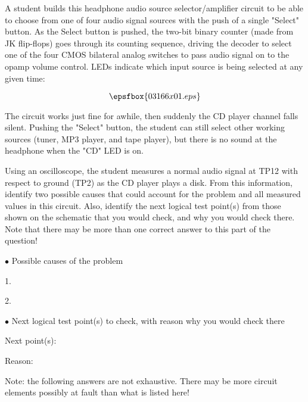 

A student builds this headphone audio source selector/amplifier circuit to be able to choose from one of four audio signal sources with the push of a single "Select" button.  As the Select button is pushed, the two-bit binary counter (made from JK flip-flops) goes through its counting sequence, driving the decoder to select one of the four CMOS bilateral analog switches to pass audio signal on to the opamp volume control.  LEDs indicate which input source is being selected at any given time:

$$\epsfbox{03166x01.eps}$$

The circuit works just fine for awhile, then suddenly the CD player channel falls silent.  Pushing the "Select" button, the student can still select other working sources (tuner, MP3 player, and tape player), but there is no sound at the headphone when the "CD" LED is on.

Using an oscilloscope, the student measures a normal audio signal at TP12 with respect to ground (TP2) as the CD player plays a disk.  From this information, identify two possible causes that could account for the problem and all measured values in this circuit.  Also, identify the next logical test point(s) from those shown on the schematic that you would check, and why you would check there.  Note that there may be more than one correct answer to this part of the question!

\medskip
\goodbreak
\item{$\bullet$} Possible causes of the problem
\item{1.}
\item{2.} 
\medskip

\medskip
\item{$\bullet$} Next logical test point(s) to check, with reason why you would check there
\item{Next point(s):}
\item{Reason:}
\medskip







Note: the following answers are not exhaustive.  There may be more circuit elements possibly at fault than what is listed here!

